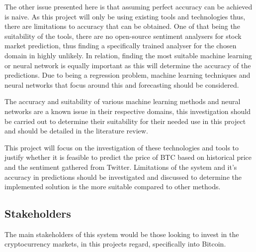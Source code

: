 \documentclass[oneside, 10pt]{article}
\begin{document}
		The other issue presented here is that assuming perfect accuracy can be achieved is naive. As this project will only be using existing tools and technologies thus, there are limitations to accuracy that can be obtained. One of that being the suitability of the tools, there are no open-source sentiment analysers for stock market prediction, thus finding a specifically trained analyser for the chosen domain in highly unlikely. In relation, finding the most suitable machine learning or neural network is equally important as this will determine the accuracy of the predictions. Due to being a regression problem, machine learning techniques and neural networks that focus around this and forecasting should be considered.
		
		The accuracy and suitability of various machine learning methods and neural networks are a known issue in their respective domains, this investigation should be carried out to determine their suitability for their needed use in this project and should be detailed in the literature review.
		
		This project will focus on the investigation of these technologies and tools to justify whether it is feasible to predict the price of BTC based on historical price and the sentiment gathered from Twitter. Limitations of the system and it's accuracy in predictions should be investigated and discussed to determine the implemented solution is the more suitable compared to other methods.  
		
		\subsection{Stakeholders}\label{stakeholders}
		The main stakeholders of this system would be those looking to invest in the cryptocurrency markets, in this projects regard, specifically into Bitcoin. 
		
\end{document}
